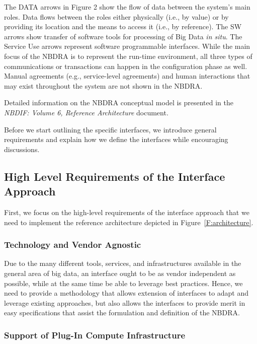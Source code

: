 \documentclass[10pt]{article}
\begin{document}
The DATA arrows in Figure 2 show the flow of data between the system’s main roles. Data flows 
between the roles either physically (i.e., by value) or by providing its location and the means
to access it (i.e., by reference). The SW arrows show transfer of software tools for processing of
Big Data {\it in situ}. The Service Use arrows represent software programmable interfaces. While the
main focus of the NBDRA is to represent the run-time environment, all three types of communications 
or transactions can happen in the configuration phase as well. Manual agreements (e.g., service-level
agreements) and human interactions that may exist throughout the system are not shown in the NBDRA.

Detailed information on the NBDRA conceptual model is presented in the 
{\it NBDIF: Volume 6, Reference Architecture} document.


Before we start outlining the specific interfaces, we introduce
general requirements and explain how we define the interfaces while
encouraging discussions.

\subsection{High Level Requirements of the Interface Approach}

First, we focus on the high-level requirements of the interface
approach that we need to implement the reference architecture depicted
in Figure~\ref{F:architecture}.

\subsubsection{Technology and Vendor Agnostic}

Due to the many different tools, services, and infrastructures
available in the general area of big data, an interface ought to be as
vendor independent as possible, while at the same time be able to
leverage best practices. Hence, we need to provide a methodology that
allows extension of interfaces to adapt and leverage existing
approaches, but also allows the interfaces to provide merit in easy
specifications that assist the formulation and definition of the
NBDRA.

\subsubsection{Support of Plug-In Compute Infrastructure}
\end{document}
